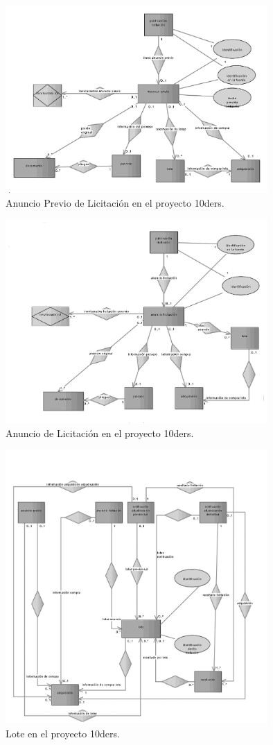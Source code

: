 \begin{figure}[!htb]
\centering
	\includegraphics[width=10cm]{images/phd/eproc/10ders-2}
\caption{Anuncio Previo de Licitación en el proyecto 10ders.}
\label{fig:10ders-2}
\end{figure}


\begin{figure}[!htb]
\centering
	\includegraphics[width=10cm]{images/phd/eproc/10ders-3}
\caption{Anuncio de Licitación en el proyecto 10ders.}
\label{fig:10ders-3}
\end{figure}

\begin{figure}[!htb]
\centering
	\includegraphics[width=10cm]{images/phd/eproc/10ders-6}
\caption{Lote en el proyecto 10ders.}
\label{fig:10ders-6}
\end{figure}


